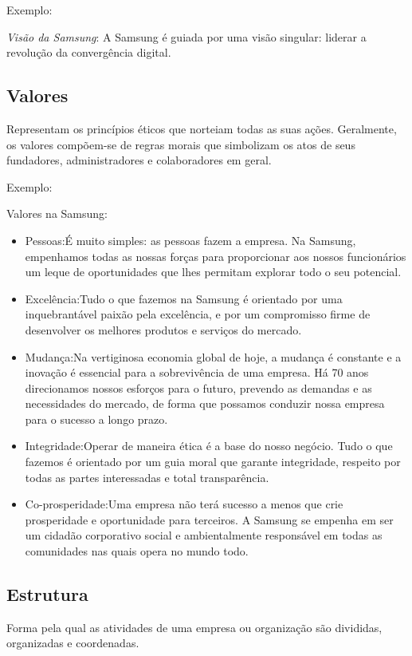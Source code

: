 \documentclass[11pt]{article}
\begin{document}
Exemplo:

\textit{Visão da Samsung}: A Samsung é guiada por uma visão singular: liderar a revolução da convergência digital. 

\subsection{Valores}

Representam os princípios éticos que norteiam todas as suas ações. Geralmente, os valores compõem-se de regras morais que simbolizam os atos de seus fundadores, administradores e colaboradores em geral.

Exemplo: 

Valores na Samsung:

\begin{itemize}

	\item Pessoas:É muito simples: as pessoas fazem a empresa. Na Samsung, empenhamos todas as nossas forças para proporcionar aos nossos funcionários um leque de oportunidades que lhes permitam explorar todo o seu potencial.
	\item Excelência:Tudo o que fazemos na Samsung é orientado por uma inquebrantável paixão pela excelência, e por um compromisso firme de desenvolver os melhores produtos e serviços do mercado.
	\item Mudança:Na vertiginosa economia global de hoje, a mudança é constante e a inovação é essencial para a sobrevivência de uma empresa. Há 70 anos direcionamos nossos esforços para o futuro, prevendo as demandas e as necessidades do mercado, de forma que possamos conduzir nossa empresa para o sucesso a longo prazo.
	\item Integridade:Operar de maneira ética é a base do nosso negócio. Tudo o que fazemos é orientado por um guia moral que garante integridade, respeito por todas as partes interessadas e total transparência.
	\item Co-prosperidade:Uma empresa não terá sucesso a menos que crie prosperidade e oportunidade para terceiros. A Samsung se empenha em ser um cidadão corporativo social e ambientalmente responsável em todas as comunidades nas quais opera no mundo todo.
\end{itemize}	

\subsection{Estrutura}
Forma pela qual as atividades de uma empresa ou organização são divididas, organizadas e coordenadas. 
\end{document}
